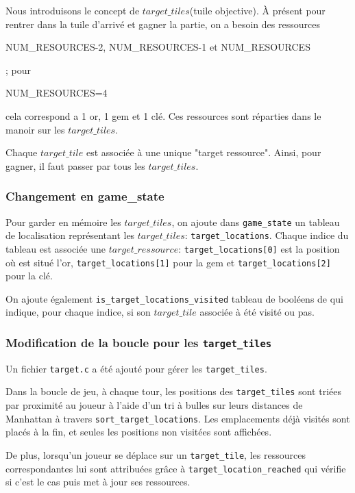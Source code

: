 
Nous introduisons le concept de $target\_tiles$(tuile objective). \`A présent pour rentrer dans la tuile d'arrivé et gagner la partie, on a besoin des ressources \begin{scriptsize}NUM\_RESOURCES-2, NUM\_RESOURCES-1 et NUM\_RESOURCES\end{scriptsize}; pour  \begin{scriptsize}NUM\_RESOURCES=4\end{scriptsize} cela correspond a 1 or, 1 gem et 1 clé. Ces ressources sont réparties dans le manoir sur les $target\_tiles$.

Chaque $target\_tile$ est associée à une unique "target ressource". Ainsi, pour gagner, il faut passer par tous les $target\_tiles$.

\subsubsection{Changement en game\_state}

Pour garder en mémoire les $target\_tiles$, on ajoute dans \texttt{game\_state} un tableau de localisation représentant les $target\_tiles$: \texttt{target\_locations}. Chaque indice du tableau est associée une $target\_ressource$: \texttt{target\_locations[0]} est la position où est situé l'or, \texttt{target\_locations[1]} pour la gem et \texttt{target\_locations[2]} pour la clé.  

On ajoute également \texttt{is\_target\_locations\_visited} tableau de booléens de qui indique, pour chaque indice, si son $target\_tile$ associée à été visité ou pas.

\subsubsection{Modification de la boucle pour les \texttt{target\_tiles}}

Un fichier \texttt{target.c} a été ajouté pour gérer les \texttt{target\_tiles}.  

Dans la boucle de jeu, à chaque tour, les positions des \texttt{target\_tiles} sont triées par proximité au joueur à l'aide d'un tri à bulles sur leurs distances de Manhattan à travers \texttt{sort\_target\_locations}. Les emplacements déjà visités sont placés à la fin, et seules les positions non visitées sont affichées.  

De plus, lorsqu’un joueur se déplace sur un \texttt{target\_tile}, les ressources correspondantes lui sont attribuées grâce à \texttt{target\_location\_reached} qui vérifie si c’est le cas puis met à jour ses ressources.

